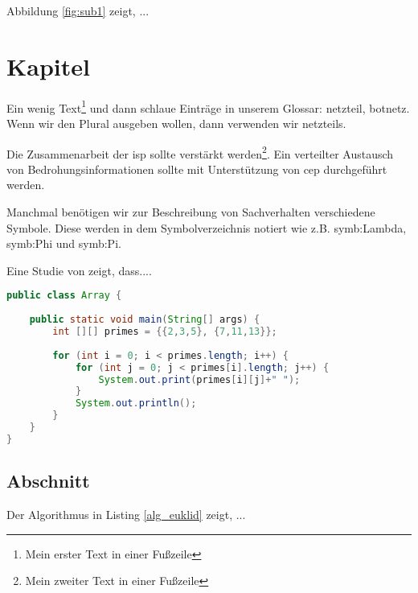 \documentclass[twoside,12pt]{scrartcl}
\begin{document}
	\vspace{1cm}
	
	Abbildung \ref{fig:sub1} zeigt, ...
	
	
	\vspace{1cm}
	
	\section{Kapitel}
\Blindtext

	
Ein wenig Text\footnote{Mein erster Text in einer Fußzeile} und dann schlaue Einträge in unserem Glossar: \gls{netzteil}, \gls{botnetz}. Wenn wir den Plural ausgeben wollen, dann verwenden wir \glspl{netzteil}.

Die Zusammenarbeit der \gls{isp} sollte verstärkt werden\footnote{Mein zweiter Text in einer Fußzeile}. Ein verteilter Austausch von Bedrohungsinformationen sollte mit Unterstützung von \gls{cep} durchgeführt werden.


Manchmal benötigen wir zur Beschreibung von Sachverhalten verschiedene Symbole. Diese werden in dem Symbolverzeichnis notiert wie z.B. \gls{symb:Lambda}, \gls{symb:Phi} und \gls{symb:Pi}. 
\vspace{0.5cm}

Eine Studie von \citet{Hofstede2014} zeigt, dass....

\begin{lstlisting}[language=Java, caption={Matrix},label=alg_euklid,style=eclipse-java,moreemph={[2]out}]
public class Array {
	
	public static void main(String[] args) {
		int [][] primes = {{2,3,5}, {7,11,13}};
		
		for (int i = 0; i < primes.length; i++) {
			for (int j = 0; j < primes[i].length; j++) {
				System.out.print(primes[i][j]+" ");
			}
			System.out.println();
		}
	}
}
\end{lstlisting}

\subsection{Abschnitt}

	\blindtext
	
	\vspace{1cm}
	Der Algorithmus in Listing \ref{alg_euklid} zeigt, ...
		\vspace{1cm}
	
\end{document}
